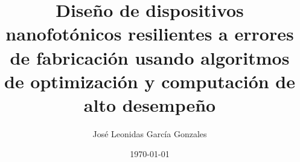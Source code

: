 \documentclass[a4paper, 12pt, oneside]{tesisutec}
\begin{document}
\frontmatter
{}

\title{Diseño de dispositivos nanofotónicos resilientes a errores de fabricación usando algoritmos de optimización y computación de alto desempeño}
\author{José Leonidas García Gonzales}
\date{\today}

\maketitle
{}

%
%
%

\tableofcontents
\newpage
\listoftables
\newpage
\listoffigures


\mainmatter
\pagestyle{fancy}

%
%


%
%
%
%
%


\renewcommand{\bibname}{\large\bf{REFERENCIAS BIBLIOGRÁFICAS}}
\end{document}

